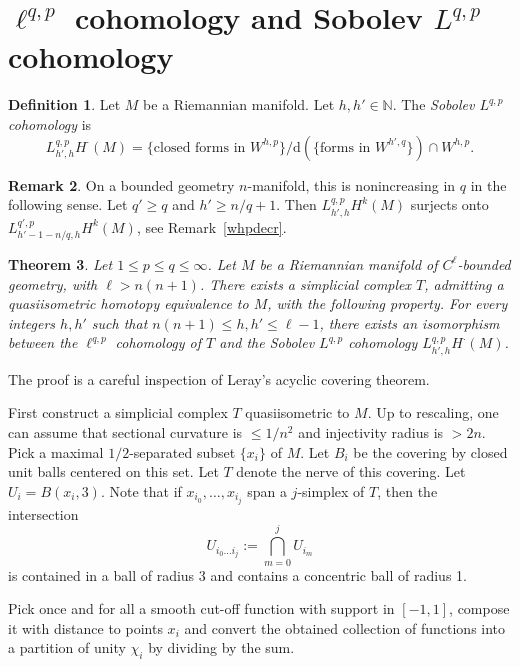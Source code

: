 \documentclass[11pt]{article}
\newtheorem{theo}{Theorem}[section]
\theoremstyle{definition}
\newtheorem{defi}[theo]{Definition}
\newtheorem{rema}[theo]{Remark}
\numberwithin{equation}{section}
\numberwithin{figure}{section}
\numberwithin{table}{section}
\newcommand{\N}{\mathbb{N}}
\newcommand{\dd}{\mathrm{d}}
\begin{document}
\section{\texorpdfstring{$\ell^{q,p}$}{ell(q,p)} cohomology and Sobolev \texorpdfstring{$L^{q,p}$}{L(q,p)} cohomology}\label{sec:leray}

\begin{defi}
Let $M$ be a Riemannian manifold. Let $h, h'\in\N$. The
\emph{Sobolev $L^{q,p}$ cohomology} is
\[
L_{h',h}^{q,p}H^{\cdot}(M)=\{\text{closed forms in }W^{h,p}\} / \dd(\{\text{forms in }W^{h',q}\}) \cap W^{h,p}.
\]
\end{defi}

\begin{rema}\label{rem:decreasing}
On a bounded geometry $n$-manifold, this is nonincreasing in $q$ in the following sense. Let $q'\geq q$ and $h'\geq n/q + 1$. Then $L_{h',h}^{q,p}H^{k}(M)$ surjects onto $L_{h'-1 - n/q,h}^{q',p}H^{k}(M)$, see Remark~\ref{whpdecr}.
\end{rema}

\begin{theo}\label{prop:leray}
Let $1\leq p\leq q\leq \infty$. Let $M$ be a Riemannian manifold of $C^\ell$-bounded geometry, with $\ell > n(n+1)$. There exists a simplicial complex $T$, admitting a quasiisometric homotopy equivalence to $M$, with the following property. For every integers $h,h'$ such that $n(n+1) \leq h,h'\leq \ell -1$, there exists an isomorphism between the $\ell^{q,p}$ cohomology of $T$ and the Sobolev $L^{q,p}$ cohomology $L_{h',h}^{q,p}H^{\cdot}(M)$.
\end{theo}

The proof is a careful inspection of Leray's acyclic covering theorem.

First construct a simplicial complex $T$ quasiisometric to $M$. Up to rescaling, one can assume that sectional curvature is $\leq 1/n^2$ and injectivity radius is $>2n$. Pick a maximal $1/2$-separated subset $\{x_i\}$ of $M$. Let $B_i$ be the covering by closed unit balls centered on this set. Let $T$ denote the nerve of this covering. Let $U_i=B(x_i,3)$. Note that if $x_{i_0},\dots,x_{i_j}$ span a $j$-simplex of $T$, then the intersection
\[
U_{{i_0}\dots{i_j}} := \bigcap_{m=0}^{j}U_{i_m}
\]
is contained in a ball of radius 3 and contains a concentric ball of radius 1.

Pick once and for all a smooth cut-off function with support in $[-1,1]$, compose it with distance to points $x_i$ and convert the obtained collection of functions into a partition of unity $\chi_i$ by dividing by the sum.
\end{document}
